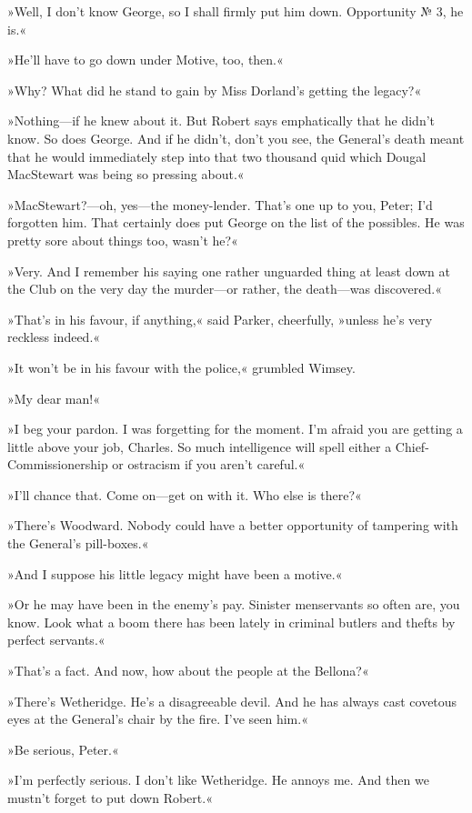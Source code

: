 »Well, I don't know George, so I shall firmly put him down. Opportunity № 3, he is.«

»He'll have to go down under Motive, too, then.«

»Why? What did he stand to gain by Miss Dorland's getting the legacy?«

»Nothing—if he knew about it. But Robert says emphatically that he didn't know. So does George. And if he didn't, don't you see, the General's death meant that he would immediately step into that two thousand quid which Dougal MacStewart was being so pressing about.«

»MacStewart?—oh, yes—the money-lender. That's one up to you, Peter; I'd forgotten him. That certainly does put George on the list of the possibles. He was pretty sore about things too, wasn't he?«

»Very. And I remember his saying one rather unguarded thing at least down at the Club on the very day the murder—or rather, the death—was discovered.«

»That's in his favour, if anything,« said Parker, cheerfully, »unless he's very reckless indeed.«

»It won't be in his favour with the police,« grumbled Wimsey.

»My dear man!«

»I beg your pardon. I was forgetting for the moment. I'm afraid you are getting a little above your job, Charles. So much intelligence will spell either a Chief-Commissionership or ostracism if you aren't careful.«

»I'll chance that. Come on—get on with it. Who else is there?«

»There's Woodward. Nobody could have a better opportunity of tampering with the General's pill-boxes.«

»And I suppose his little legacy might have been a motive.«

»Or he may have been in the enemy's pay. Sinister menservants so often are, you know. Look what a boom there has been lately in criminal butlers and thefts by perfect servants.«

»That's a fact. And now, how about the people at the Bellona?«

»There's Wetheridge. He's a disagreeable devil. And he has always cast covetous eyes at the General's chair by the fire. I've seen him.«

»Be serious, Peter.«

»I'm perfectly serious. I don't like Wetheridge. He annoys me. And then we mustn't forget to put down Robert.«

